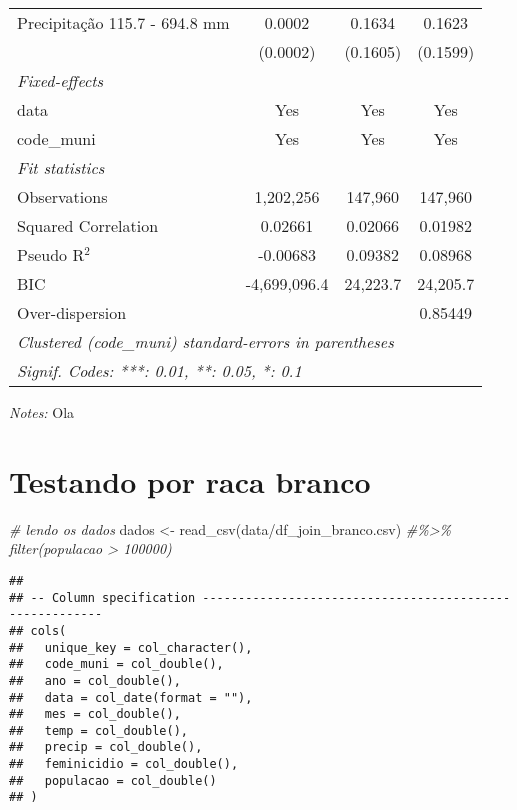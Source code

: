 \documentclass[
]{article}
\newenvironment{Shaded}{\begin{snugshade}}{\end{snugshade}}
\newcommand{\CommentTok}[1]{\textcolor[rgb]{0.56,0.35,0.01}{\textit{#1}}}
\newcommand{\FunctionTok}[1]{\textcolor[rgb]{0.00,0.00,0.00}{#1}}
\newcommand{\NormalTok}[1]{#1}
\newcommand{\OtherTok}[1]{\textcolor[rgb]{0.56,0.35,0.01}{#1}}
\newcommand{\StringTok}[1]{\textcolor[rgb]{0.31,0.60,0.02}{#1}}
\begin{document}
\begin{tabular}{lccc}
Precipitação 115.7 - 694.8 mm & 0.0002 & 0.1634 & 0.1623\\
  &(0.0002) & (0.1605) & (0.1599)\\
\midrule \emph{Fixed-effects}&   &   &  \\
data & Yes & Yes & Yes\\
code\_muni & Yes & Yes & Yes\\
\midrule \emph{Fit statistics}&  & & \\
Observations & 1,202,256&147,960&147,960\\
Squared Correlation & 0.02661&0.02066&0.01982\\
Pseudo R$^2$ & -0.00683&0.09382&0.08968\\
BIC & -4,699,096.4&24,223.7&24,205.7\\
Over-dispersion & &&0.85449\\
\midrule\midrule\multicolumn{4}{l}{\emph{Clustered (code\_muni) standard-errors in parentheses}}\\
\multicolumn{4}{l}{\emph{Signif. Codes: ***: 0.01, **: 0.05, *: 0.1}}\\
\end{tabular}

\medskip \emph{Notes:} Ola

\hypertarget{testando-por-raca-branco}{%
\section{Testando por raca branco}\label{testando-por-raca-branco}}

\begin{Shaded}
\begin{Highlighting}[]
\CommentTok{\# lendo os dados}
\NormalTok{dados }\OtherTok{\textless{}{-}} \FunctionTok{read\_csv}\NormalTok{(}\StringTok{\textquotesingle{}data/df\_join\_branco.csv\textquotesingle{}}\NormalTok{) }\CommentTok{\#\%\textgreater{}\% filter(populacao \textgreater{} 100000)}
\end{Highlighting}
\end{Shaded}

\begin{verbatim}
## 
## -- Column specification --------------------------------------------------------
## cols(
##   unique_key = col_character(),
##   code_muni = col_double(),
##   ano = col_double(),
##   data = col_date(format = ""),
##   mes = col_double(),
##   temp = col_double(),
##   precip = col_double(),
##   feminicidio = col_double(),
##   populacao = col_double()
## )
\end{verbatim}
\end{document}
